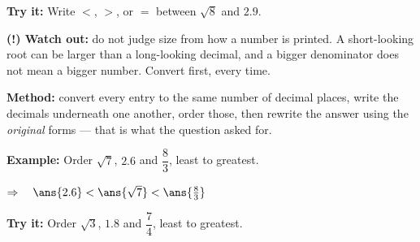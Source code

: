 \documentclass[12pt]{article}
\begin{document}
\begin{tryitbox}
\textbf{Try it:} \quad Write $<$, $>$, or $=$ between $\sqrt{8}$ and $2.9$.\\[2pt]
\end{tryitbox}

\begin{watchoutbox}
\textbf{(!) Watch out:} do not judge size from how a number is printed. A short-looking
root can be larger than a long-looking decimal, and a bigger denominator does not mean a
bigger number. Convert first, every time.
\end{watchoutbox}


\begin{formulabox}
\textbf{Method:} convert every entry to the same number of decimal places, write the
decimals underneath one another, order those, then rewrite the answer using the
\emph{original} forms --- that is what the question asked for.
\end{formulabox}

\begin{examplebox}
\textbf{Example:} \quad Order $\sqrt{7}$, $2.6$ and $\dfrac{8}{3}$, least to greatest.

$\Rightarrow\quad \ans{2.6} < \ans{\sqrt{7}} < \ans{\tfrac{8}{3}}$
\end{examplebox}

\begin{tryitbox}
\textbf{Try it:} \quad Order $\sqrt{3}$, $1.8$ and $\dfrac{7}{4}$, least to greatest.\\[2pt]
\end{tryitbox}
\end{document}
